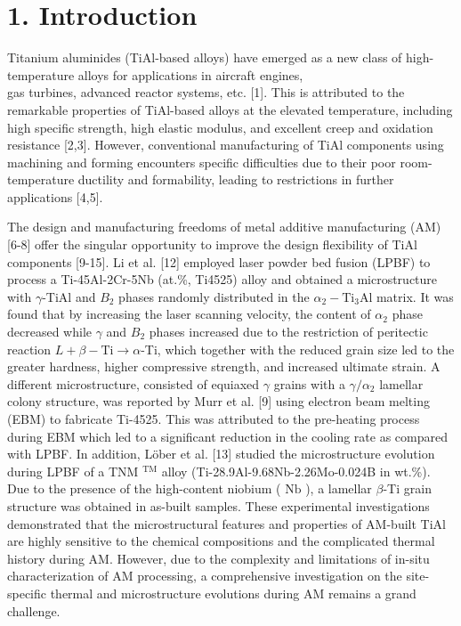 \documentclass[10pt]{article}
\begin{document}
\section*{1. Introduction}
Titanium aluminides (TiAl-based alloys) have emerged as a new class of high-temperature alloys for applications in aircraft engines,\\
gas turbines, advanced reactor systems, etc. [1]. This is attributed to the remarkable properties of TiAl-based alloys at the elevated temperature, including high specific strength, high elastic modulus, and excellent creep and oxidation resistance [2,3]. However, conventional manufacturing of TiAl components using machining and forming encounters specific difficulties due to their poor room-temperature ductility and formability, leading to restrictions in further applications [4,5].

The design and manufacturing freedoms of metal additive manufacturing (AM) [6-8] offer the singular opportunity to improve the design flexibility of TiAl components [9-15]. Li et al. [12] employed laser powder bed fusion (LPBF) to process a Ti-45Al-2Cr-5Nb (at.\%, Ti4525) alloy and obtained a microstructure with $\gamma$-TiAl and $B_{2}$ phases randomly distributed in the $\alpha_{2}-\mathrm{Ti}_{3} \mathrm{Al}$ matrix. It was found that by increasing the laser scanning velocity, the content of $\alpha_{2}$ phase decreased while $\gamma$ and $B_{2}$ phases increased due to the restriction of peritectic reaction $L+\beta-\mathrm{Ti} \rightarrow \alpha$-Ti, which together with the reduced grain size led to the greater hardness, higher compressive strength, and increased ultimate strain. A different microstructure, consisted of equiaxed $\gamma$ grains with a $\gamma / \alpha_{2}$ lamellar colony structure, was reported by Murr et al. [9] using electron beam melting (EBM) to fabricate Ti-4525. This was attributed to the pre-heating process during EBM which led to a significant reduction in the cooling rate as compared with LPBF. In addition, Löber et al. [13] studied the microstructure evolution during LPBF of a TNM $^{\mathrm{TM}}$ alloy (Ti-28.9Al-9.68Nb-2.26Mo-0.024B in wt.\%). Due to the presence of the high-content niobium ( $\mathrm{Nb}$ ), a lamellar $\beta$-Ti grain structure was obtained in as-built samples. These experimental investigations demonstrated that the microstructural features and properties of AM-built TiAl are highly sensitive to the chemical compositions and the complicated thermal history during AM. However, due to the complexity and limitations of in-situ characterization of AM processing, a comprehensive investigation on the site-specific thermal and microstructure evolutions during AM remains a grand challenge.
\end{document}
